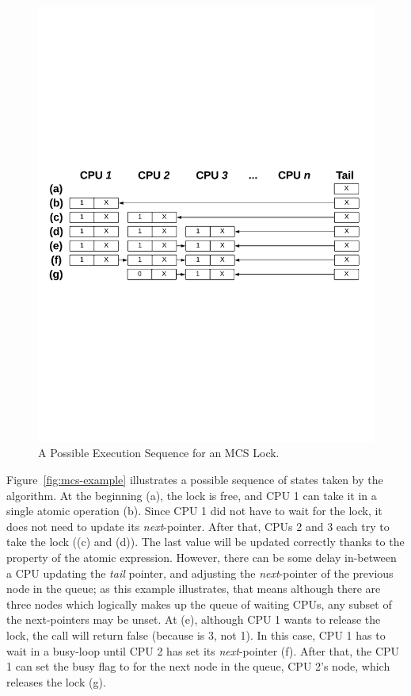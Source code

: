 \begin{figure}
\begin{center}
\includegraphics[width=1\linewidth]{figs/mcslock/mcsex}
\end{center}
\caption{A Possible Execution Sequence for an MCS Lock.}
\label{fig:chapter:mcslock:mcs-example}
\end{figure}

Figure~\ref{fig:mcs-example} illustrates a possible sequence of states taken by the algorithm. 
At the beginning (a), the lock is free, and CPU 1 can take it in a single atomic  operation (b).
Since CPU 1 did not have to wait for the lock, it does not need to update its \emph{next}-pointer. 
After that, CPUs 2 and 3 each try to take the lock ((c) and (d)). 
The last value will be updated correctly thanks to the property of the atomic expression.
However, there can be some delay in-between a CPU updating the \emph{tail} pointer, and adjusting the \emph{next}-pointer of the previous node in the queue; as this example illustrates, that means although there are three nodes which logically makes up the queue of waiting CPUs, any subset of the next-pointers may be unset. 
At (e), although CPU 1 wants to release the lock, the 
call will return false (because  is 3, not 1).
In this case, CPU 1 has to wait in a busy-loop until CPU 2 has set its \emph{next}-pointer (f).
After that, the CPU 1 can set the busy flag to  for the next node in the queue, CPU 2's node, which releases the lock (g).

